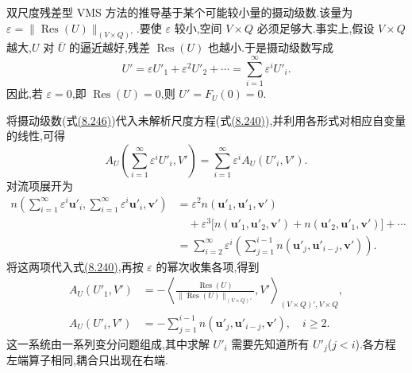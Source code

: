\begin{note}[摄动级数]
\label{note:vms-perturbation-series}
双尺度残差型 VMS 方法的推导基于某个可能较小量的摄动级数.该量为
$\varepsilon=\|\operatorname{Res}(U)\|_{(V\times Q)'}$.要使 $\varepsilon$ 较小,空间 $V\times Q$ 必须足够大.事实上,假设 $V\times Q$ 越大,$U$ 对 $\overline U$ 的逼近越好,残差 $\operatorname{Res}(U)$ 也越小.于是摄动级数写成
\begin{equation}\label{eq:vms-perturbation-series}
 U'=\varepsilon U'_1+\varepsilon^2U'_2+\cdots
   =\sum_{i=1}^{\infty}\varepsilon^iU'_i.
\end{equation}
因此,若 $\varepsilon=0$,即 $\operatorname{Res}(U)=0$,则 $U'=F_U(0)=0$.
\end{note}

\begin{note}[摄动级数给出的未解析尺度方程]
\label{note:vms-unresolved-equation-perturbation}
将摄动级数(式\hyperref[eq:vms-perturbation-series]{(8.246)})代入未解析尺度方程(式\hyperref[eq:vms-two-scale-unresolved-equation]{(8.240)}),并利用各形式对相应自变量的线性,可得
\[
 A_U\left(\sum_{i=1}^{\infty}\varepsilon^iU'_i,V'\right)
 =\sum_{i=1}^{\infty}\varepsilon^iA_U(U'_i,V').
\]
对流项展开为
\[
\begin{aligned}
 n\left(\sum_{i=1}^{\infty}\varepsilon^i\bm{u}'_i,
        \sum_{i=1}^{\infty}\varepsilon^i\bm{u}'_i,
        \bm{v}'\right)
 &=\varepsilon^2n(\bm{u}'_1,\bm{u}'_1,\bm{v}')\\
 &\quad+\varepsilon^3\bigl[
 n(\bm{u}'_1,\bm{u}'_2,\bm{v}')
 +n(\bm{u}'_2,\bm{u}'_1,\bm{v}')\bigr]+\cdots\\
 &=\sum_{i=2}^{\infty}\varepsilon^i
    \left(\sum_{j=1}^{i-1}
      n(\bm{u}'_j,\bm{u}'_{i-j},\bm{v}')\right).
\end{aligned}
\]
将这两项代入式\hyperref[eq:vms-two-scale-unresolved-equation]{(8.240)},再按 $\varepsilon$ 的幂次收集各项,得到
\begin{equation}\label{eq:vms-perturbation-first-order}
\begin{aligned}
 A_U(U'_1,V')
 &=-\left\langle
  \frac{\operatorname{Res}(U)}{\|\operatorname{Res}(U)\|_{(V\times Q)'}},
  V'\right\rangle_{(V\times Q)',V\times Q},\\
 A_U(U'_i,V')
 &=-\sum_{j=1}^{i-1}n(\bm{u}'_j,\bm{u}'_{i-j},\bm{v}'),
 \quad i\ge2.
\end{aligned}
\end{equation}
这一系统由一系列变分问题组成,其中求解 $U'_i$ 需要先知道所有 $U'_j$($j<i$).各方程左端算子相同,耦合只出现在右端.
\end{note}


